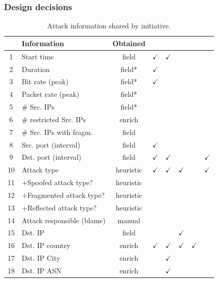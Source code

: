 \documentclass{llncs}
\begin{document}
\subsubsection{Design decisions}
\begin{table}[h!] 
\small 
\center 
\caption{Attack information shared by initiative.}
\label{tab:attack_fields} 

\begin{tabular}{|c| l | c |c|c|c|c|c|} 
\hline
&\textbf{Information}      & \textbf{Obtained}&\cite{digitalattackmap2013web} &
\cite{norse2015web}& \cite{ipew2015web}  & \cite{fireeye2015web} &
\cite{kaspersky2015web2}\\ \hline

1&Start time 	&field&  $\checkmark$	& $\checkmark$	& ~& ~ & ~    \\ \hline    
2&Duration 		&field*& $\checkmark$	& ~ & ~& ~ & ~   \\ \hline 
3& Bit rate (peak)	&field*& $\checkmark$	& ~ & ~ & ~ & ~\\ \hline 
4& Packet rate (peak) & field*&&&&&\\ \hline
5&\# Src. IPs &field*&&&&&\\\hline	
6&\# restricted Src. IPs & enrich &&&&&\\\hline 
7&\# Src. IPs with fragm. & field&&&&& \\\hline
8&Src.  port (interval)	&field& $\checkmark$	& ~ & ~ & ~ & ~   \\\hline 
9&Dst.  port (interval) &field& $\checkmark$	& $\checkmark$	& ~ & ~ & $\checkmark$\\ \hline 
10&Attack type&heuristic& $\checkmark$ & $\checkmark$	& $\checkmark$ &~ & $\checkmark$    \\ \hline 
11&+Spoofed attack type?&heuristic& &&&&\\ \hline 
12&+Fragmented attack type?&heuristic& &&&&\\ \hline 
13&+Reflected attack type?&heuristic& &&&&\\ \hline 
14&Attack responsible (blame)& manual&&&&&\\\hline\hline\hline

\rowcolor{red}15&Dst.  IP &field& ~ & ~ & $\checkmark$& ~ & ~ \\\hline
16&Dst. IP country&enrich& $\checkmark$ & $\checkmark$	& $\checkmark$& $\checkmark$ & ~ \\ \hline 
\rowcolor{red}17&Dst. IP City &enrich& ~ & $\checkmark$	& ~ & ~ & ~   \\\hline 
\rowcolor{red}18&Dst. IP ASN &enrich& ~ & $\checkmark$ & ~ & ~ & ~ \\ \hline\hline\hline


\end{tabular}
\end{table}
\end{document}
